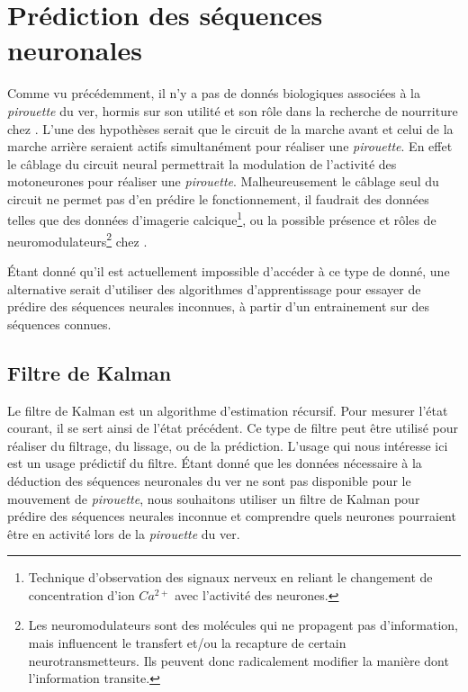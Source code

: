 \chapter{Prédiction des séquences neuronales} %
\label{cha:Prédire des séquences neuronales}

Comme vu précédemment, il n'y a pas de donnés biologiques associées à la
\textit{pirouette} du ver, hormis sur son utilité et son rôle dans la recherche
de nourriture chez \celeg{}\cite{Gray2005}. L'une des hypothèses serait que le
circuit de la marche avant et celui de la marche arrière seraient actifs
simultanément pour réaliser une \textit{pirouette}. En effet le câblage du
circuit neural permettrait la modulation de l'activité des motoneurones pour
réaliser une \textit{pirouette}. Malheureusement le câblage seul du circuit ne
permet pas d'en prédire le fonctionnement, il faudrait des données telles que
des données d'imagerie calcique\footnote{Technique d'observation des signaux
nerveux en reliant le changement de concentration d'ion $Ca^{2+}$ avec
l'activité des neurones.}, ou la possible présence et rôles de
neuromodulateurs\footnote{Les neuromodulateurs sont des molécules qui ne
propagent pas d'information, mais influencent le transfert et/ou la recapture
de certain neurotransmetteurs. Ils peuvent donc radicalement modifier la
manière dont l'information transite.} chez \celeg{}.

Étant donné qu'il est actuellement impossible d'accéder à ce type de donné, une
alternative serait d'utiliser des algorithmes d'apprentissage pour essayer de
prédire des séquences neurales inconnues, à partir d'un entrainement sur des
séquences connues.

\section{Filtre de Kalman} %
\label{sec:Filtre de Kalman}

Le filtre de Kalman est un algorithme d'estimation récursif. Pour mesurer
l'état courant, il se sert ainsi de l'état précédent. Ce type de filtre peut
être utilisé pour réaliser du filtrage, du lissage, ou de la prédiction.
L'usage qui nous intéresse ici est un usage prédictif du filtre. Étant donné
que les données nécessaire à la déduction des séquences neuronales du ver ne
sont pas disponible pour le mouvement de \textit{pirouette}, nous souhaitons
utiliser un filtre de Kalman pour prédire des séquences neurales inconnue et
comprendre quels neurones pourraient être en activité lors de la
\textit{pirouette} du ver.

